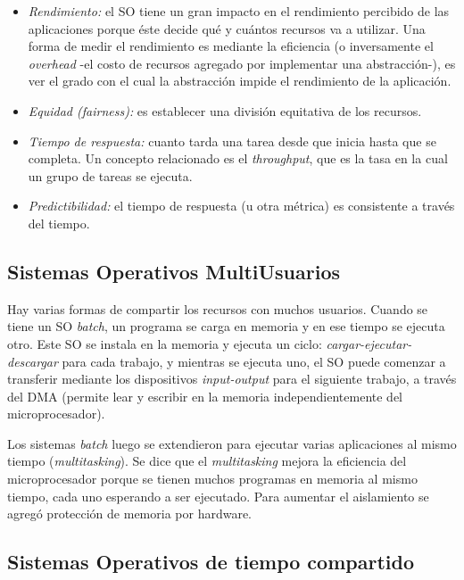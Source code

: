 \documentclass[a4paper,10pt,spanish]{article}
\begin{document}
\begin{itemize}
\item \textit{Rendimiento:} el SO tiene un gran impacto en el rendimiento percibido de las aplicaciones porque éste decide qué y cuántos recursos va a utilizar. Una forma de medir el rendimiento es mediante la eficiencia (o inversamente el \textit{overhead} -el costo de recursos agregado por implementar una abstracción-), es ver el grado con el cual la abstracción impide el rendimiento de la aplicación.

\item \textit{Equidad (fairness):} es establecer una división equitativa de los recursos.

\item \textit{Tiempo de respuesta:} cuanto tarda una tarea desde que inicia hasta que se completa. Un concepto relacionado es el \textit{throughput}, que es la tasa en la cual un grupo de tareas se ejecuta.

\item \textit{Predictibilidad:} el tiempo de respuesta (u otra métrica) es consistente a través del tiempo.

\end{itemize}

\subsection{Sistemas Operativos MultiUsuarios}

Hay varias formas de compartir los recursos con muchos usuarios. Cuando se tiene un SO \textit{batch}, un programa se carga en memoria y en ese tiempo se ejecuta otro. Este SO se instala en la memoria y ejecuta un ciclo: \textit{cargar-ejecutar-descargar} para cada trabajo, y mientras se ejecuta uno, el SO puede comenzar a transferir mediante los dispositivos \textit{input-output} para el siguiente trabajo, a través del DMA (permite lear y escribir en la memoria independientemente del microprocesador).

Los sistemas \textit{batch} luego se extendieron para ejecutar varias aplicaciones al mismo tiempo (\textit{multitasking}). Se dice que el \textit{multitasking} mejora la eficiencia del microprocesador porque se tienen muchos programas en memoria al mismo tiempo, cada uno esperando a ser ejecutado. Para aumentar el aislamiento se agregó protección de memoria por hardware. \\

\subsection{Sistemas Operativos de tiempo compartido}
\end{document}
